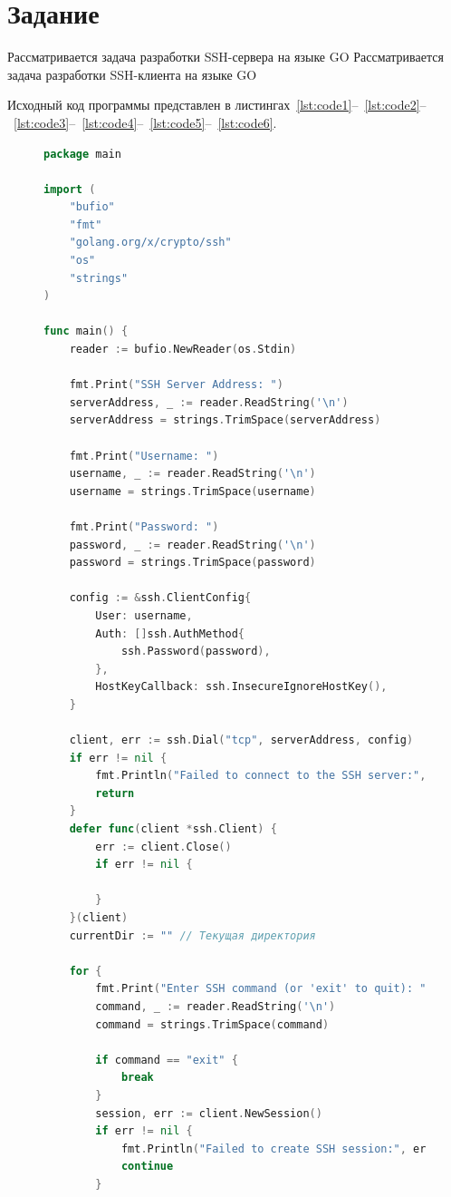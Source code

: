 \documentclass[a4paper, 14pt]{extarticle}
\begin{document}
\renewcommand{\ttdefault}{pcr}

\setlength{\tabcolsep}{3pt}
\newpage
\setcounter{page}{2}
\section{Задание}\label{Sect::task}
Рассматривается задача разработки SSH-сервера на языке GO
Рассматривается задача разработки SSH-клиента на языке GO


Исходный код программы представлен в листингах~\ref{lst:code1}--~\ref{lst:code2}--~\ref{lst:code3}--~\ref{lst:code4}--~\ref{lst:code5}--~\ref{lst:code6}.

\begin{figure}[!htb]
\begin{lstlisting}[language={Go},caption={client.go},label={lst:code1}]
package main

import (
	"bufio"
	"fmt"
	"golang.org/x/crypto/ssh"
	"os"
	"strings"
)

func main() {
	reader := bufio.NewReader(os.Stdin)

	fmt.Print("SSH Server Address: ")
	serverAddress, _ := reader.ReadString('\n')
	serverAddress = strings.TrimSpace(serverAddress)

	fmt.Print("Username: ")
	username, _ := reader.ReadString('\n')
	username = strings.TrimSpace(username)

	fmt.Print("Password: ")
	password, _ := reader.ReadString('\n')
	password = strings.TrimSpace(password)

	config := &ssh.ClientConfig{
		User: username,
		Auth: []ssh.AuthMethod{
			ssh.Password(password),
		},
		HostKeyCallback: ssh.InsecureIgnoreHostKey(),
	}

	client, err := ssh.Dial("tcp", serverAddress, config)
	if err != nil {
		fmt.Println("Failed to connect to the SSH server:", err)
		return
	}
	defer func(client *ssh.Client) {
		err := client.Close()
		if err != nil {

		}
	}(client)
	currentDir := "" // Текущая директория

	for {
		fmt.Print("Enter SSH command (or 'exit' to quit): ")
		command, _ := reader.ReadString('\n')
		command = strings.TrimSpace(command)

		if command == "exit" {
			break
		}
		session, err := client.NewSession()
		if err != nil {
			fmt.Println("Failed to create SSH session:", err)
			continue
		}

\end{lstlisting}
\end{figure}
\end{document}
